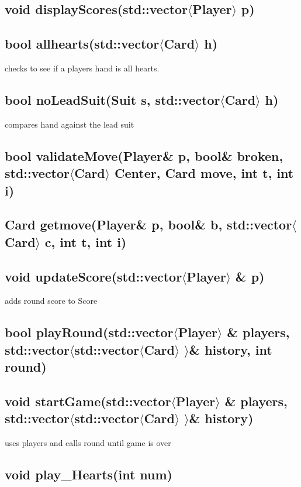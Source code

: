 \documentclass[]{scrartcl}
\begin{document}
\subsection{void displayScores(std::vector$\langle$Player$\rangle$  p)}
\subsection{bool allhearts(std::vector$\langle$Card$\rangle$ h)  }
	checks to see if a players hand is all hearts.
\subsection{bool noLeadSuit(Suit s, std::vector$\langle$Card$\rangle$ h) }
	 compares hand against the lead suit
\subsection{bool validateMove(Player\& p, bool\& broken, std::vector$\langle$Card$\rangle$  Center, Card move, int t, int i)}
\subsection{Card getmove(Player\& p, bool\& b, std::vector$\langle$Card$\rangle$  c, int t, int i)}
\subsection{void updateScore(std::vector$\langle$Player$\rangle$ \& p)}
	adds round score to Score
\subsection{bool playRound(std::vector$\langle$Player$\rangle$ \& players, std::vector$\langle$std::vector$\langle$Card$\rangle$ $\rangle$\& history, int round)}
\subsection{void startGame(std::vector$\langle$Player$\rangle$ \& players, std::vector$\langle$std::vector$\langle$Card$\rangle$ $\rangle$\& history) }
	 uses players and calls round until game is over
\subsection{void play\_Hearts(int num)}
\end{document}
